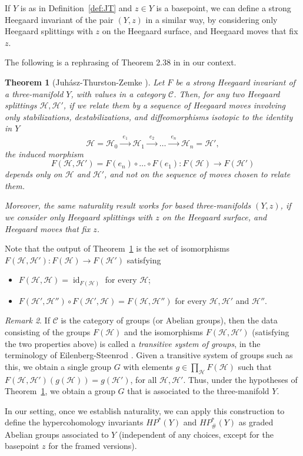 \documentclass [11pt]{amsart}
\newtheorem {theorem}{Theorem}[section]
\theoremstyle{remark}
\newtheorem {remark}[theorem]{Remark}
\def\HP{\mathit{HP}}
\def\Cat{\mathcal{C}}
\def\HPf{\HP_{\! \#}}
\def\cH{\mathcal{H}}
\def\id{\operatorname{id}}
\begin{document}
If $Y$ is as in Definition~\ref{def:JT} and $z \in Y$ is a basepoint, we can define a strong Heegaard invariant of the pair $(Y, z)$ in a similar way, by considering only Heegaard splittings with $z$ on the Heegaard surface, and Heegaard moves that fix $z$.

The following is a rephrasing of Theorem 2.38 in \cite{JuhaszThurston} in our context. 

\begin{theorem}[Juh\'asz-Thurston-Zemke \cite{JuhaszThurston}]
\label{thm:JT}
Let $F$ be a strong Heegaard invariant of a three-manifold $Y$, with values in a category $\Cat$. 
Then, for any two Heegaard splittings $\cH, \cH'$, if we relate them by a sequence of Heegaard moves involving only stabilizations, destabilizations, and diffeomorphisms isotopic to the identity in $Y$
$$\cH =\cH_0 \xrightarrow{\phantom{b} e_1 \phantom{b}} \cH_1 \xrightarrow{\phantom{b} e_2 \phantom{b}} \dots  \xrightarrow{\phantom{b} e_n \phantom{b}} \cH_n = \cH',$$
the induced morphism
$$ F(\cH, \cH')= F(e_n) \circ \dots \circ F(e_1) : F(\cH) \to F(\cH')$$
depends only on $\cH$ and $\cH'$, and not on the sequence of moves chosen to relate them.

Moreover, the same naturality result works for based three-manifolds $(Y, z)$, if we consider only Heegaard splittings with $z$ on the Heegaard surface, and Heegaard moves that fix $z$.
\end{theorem}

Note that the output of Theorem~\ref{thm:JT} is the set of isomorphisms $F(\cH, \cH') : F(\cH) \to F(\cH')$ satisfying
\begin{itemize}
\item $F(\cH, \cH) = \id_{F(\cH)}$ for every $\cH$;
\item $F(\cH', \cH'') \circ F(\cH', \cH) = F(\cH, \cH'')$ for every $\cH, \cH'$ and $\cH''$.
\end{itemize}

\begin{remark}
If $\Cat$ is the category of groups (or Abelian groups), then the data consisting of the groups $F(\cH)$ and the isomorphisms $F(\cH, \cH')$ (satisfying the two properties above) is called a {\em transitive system of groups}, in the terminology of Eilenberg-Steenrod \cite[Definition 6.1]{EilenbergSteenrod}.
Given a transitive system of groups such as this, we obtain a single group $G$ with elements $g \in \prod_{\cH} F(\cH)$ such that $F(\cH, \cH')(g(\cH)) = g(\cH')$, for all $\cH, \cH'$. Thus, under the hypotheses of Theorem~\ref{thm:JT}, we obtain a group $G$ that is associated to the three-manifold $Y$. 

In our setting, once we establish naturality, we can apply this construction to define the hypercohomology invariants $ \HP^*(Y)$ and $\HPf^*(Y)$ as graded Abelian groups associated to $Y$ (independent of any choices, except for the basepoint $z$ for the framed versions).
\end{remark}
\end{document}
